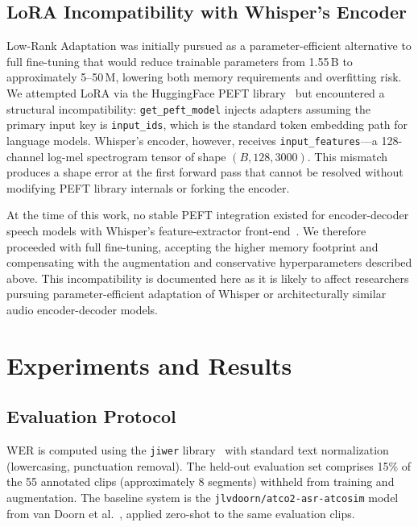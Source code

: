 \documentclass[11pt,a4paper]{article}
\begin{document}
\subsection{LoRA Incompatibility with Whisper's Encoder}
\label{sec:lora}

Low-Rank Adaptation was initially pursued as a parameter-efficient alternative
to full fine-tuning that would reduce trainable parameters from 1.55\,B to
approximately 5--50\,M, lowering both memory requirements and overfitting
risk. We attempted LoRA via the HuggingFace PEFT library~\cite{peft2023} but
encountered a structural incompatibility: \texttt{get\_peft\_model} injects
adapters assuming the primary input key is \texttt{input\_ids}, which is the
standard token embedding path for language models. Whisper's encoder, however,
receives \texttt{input\_features}---a 128-channel log-mel spectrogram tensor
of shape $(B, 128, 3000)$. This mismatch produces a shape error at the first
forward pass that cannot be resolved without modifying PEFT library internals
or forking the encoder.

At the time of this work, no stable PEFT integration existed for
encoder-decoder speech models with Whisper's feature-extractor
front-end~\cite{kim2023loraspeech}. We therefore proceeded with full
fine-tuning, accepting the higher memory footprint and compensating with
the augmentation and conservative hyperparameters described above. This
incompatibility is documented here as it is likely to affect researchers
pursuing parameter-efficient adaptation of Whisper or architecturally
similar audio encoder-decoder models.

\section{Experiments and Results}
\label{sec:experiments}

\subsection{Evaluation Protocol}

WER is computed using the \texttt{jiwer} library~\cite{jiwer2023} with
standard text normalization (lowercasing, punctuation removal). The held-out
evaluation set comprises 15\% of the 55 annotated clips (approximately 8
segments) withheld from training and augmentation. The baseline system is the
\texttt{jlvdoorn/atco2-asr-atcosim} model from van Doorn et
al.~\cite{vandoorn2024whisperatc}, applied zero-shot to the same evaluation
clips.
\end{document}
